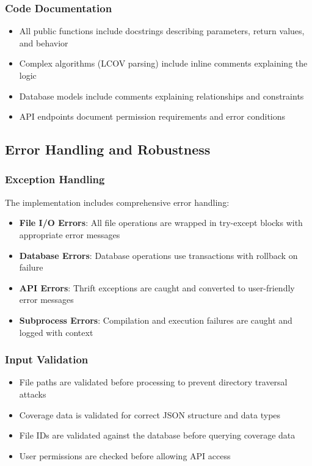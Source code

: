 \subsubsection{Code Documentation}

\begin{itemize}
    \item All public functions include docstrings describing parameters, return values, and behavior
    \item Complex algorithms (LCOV parsing) include inline comments explaining the logic
    \item Database models include comments explaining relationships and constraints
    \item API endpoints document permission requirements and error conditions
\end{itemize}

\subsection{Error Handling and Robustness}

\subsubsection{Exception Handling}

The implementation includes comprehensive error handling:
\begin{itemize}
    \item \textbf{File I/O Errors}: All file operations are wrapped in try-except blocks with appropriate error messages
    \item \textbf{Database Errors}: Database operations use transactions with rollback on failure
    \item \textbf{API Errors}: Thrift exceptions are caught and converted to user-friendly error messages
    \item \textbf{Subprocess Errors}: Compilation and execution failures are caught and logged with context
\end{itemize}

\subsubsection{Input Validation}

\begin{itemize}
    \item File paths are validated before processing to prevent directory traversal attacks
    \item Coverage data is validated for correct JSON structure and data types
    \item File IDs are validated against the database before querying coverage data
    \item User permissions are checked before allowing API access
\end{itemize}

